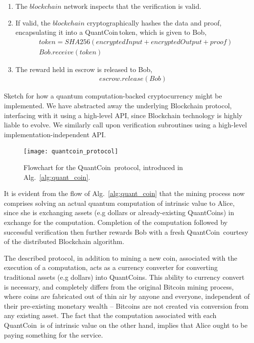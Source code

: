 \begin{table}[!htb]
{{{\begin{enumerate}
	\begin{align}
		blockchain.commit(proof)
	\end{align}
	\item The $blockchain$ network inspects that the verification is valid.
	\item If valid, the $blockchain$ cryptographically hashes the data and proof, encapsulating it into a QuantCoin\texttrademark\,token, which is given to Bob,
	\begin{align}
		&token = SHA256(encryptedInput + encryptedOutput + proof)\nonumber\\
		&Bob.receive(token)
	\end{align}
	\item The reward held in escrow is released to Bob,
	\begin{align}
		escrow.release(Bob)
	\end{align}
\end{enumerate}}}}
\caption{Sketch for how a quantum computation-backed cryptocurrency might be implemented. We have abstracted away the underlying Blockchain protocol, interfacing with it using a high-level API, since Blockchain technology is highly liable to evolve. We similarly call upon verification subroutines using a high-level implementation-independent API.} \label{alg:quant_coin}
\end{table}

\begin{figure}[!htb]
\texttt{[image: quantcoin\_protocol]}
\caption{Flowchart for the QuantCoin\texttrademark\, protocol, introduced in Alg.~\ref{alg:quant_coin}.}\label{fig:quantcoin_protocol}	
\end{figure}

It is evident from the flow of Alg.~\ref{alg:quant_coin} that the mining process now comprises solving an actual quantum computation of intrinsic value to Alice, since she is exchanging assets (e.g dollars or already-existing QuantCoins) in exchange for the computation. Completion of the computation followed by successful verification then further rewards Bob with a fresh QuantCoin\texttrademark\, courtesy of the distributed Blockchain algorithm.

The described protocol, in addition to mining a new coin, associated with the execution of a computation, acts as a currency converter for converting traditional assets (e.g dollars) into QuantCoins. This ability to currency convert is necessary, and completely differs from the original Bitcoin mining process, where coins are fabricated out of thin air by anyone and everyone, independent of their pre-existing monetary wealth -- Bitcoins are not created via conversion from any existing asset. The fact that the computation associated with each QuantCoin\texttrademark\, is of intrinsic value on the other hand, implies that Alice ought to be paying something for the service.

